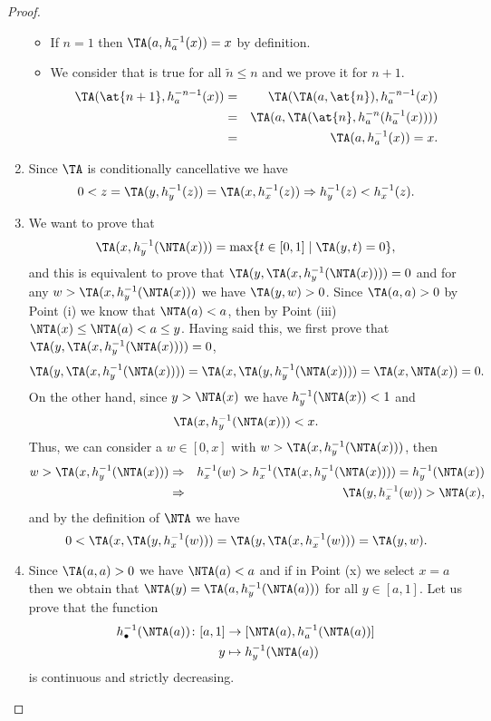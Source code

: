 \begin{proof}
\begin{enumerate}[label=(\roman*)]
\begin{itemize}
			\item If $n=1$ then $\TA(a,h_a^{-1}(x))=x$ by definition.
			\item We consider that is true for all $\tilde{n} \leq n$  and we prove it for $n+1$.
			\begin{eqnarray*}
				\TA(\at{n+1},h_a^{-n-1}(x)) &=& \TA(\TA(a,\at{n}),h_a^{-n-1}(x)) \\
				&=& \TA(a,\TA(\at{n},h_a^{-n}(h_a^{-1}(x)))) \\
				&=& \TA(a,h_a^{-1}(x))=x.
			\end{eqnarray*}
		\end{itemize}
		\item Since $\TA$ is conditionally cancellative we have
		$$0<z=\TA(y,h_y^{-1}(z))=\TA(x,h_x^{-1}(z)) \Rightarrow h_y^{-1}(z)<h_x^{-1}(z).$$
		\item We want to prove that
		$$\TA(x,h_{y}^{-1}(\NTA(x))) = \max \{ t \in [0,1] \mid \TA(y,t)=0\},$$
		and this is equivalent to prove that $\TA(y,\TA(x,h_{y}^{-1}(\NTA(x))))=0$ and for any $w>\TA(x,h_{y}^{-1}(\NTA(x)))$ we have $\TA(y,w)>0$. Since $\TA(a,a)>0$ by Point (i)  we know that $\NTA(a)<a$, then by Point (iii) $\NTA(x) \leq \NTA(a)<a \leq y$. Having said this, we first prove that $\TA(y,\TA(x,h_y^{-1}(\NTA(x))))=0$,
		$$\TA(y,\TA(x,h_y^{-1}(\NTA(x)))) = \TA(x,\TA(y,h_y^{-1}(\NTA(x)))) = \TA(x,\NTA(x))=0.$$
		On the other hand, since $ y > \NTA(x)$ we have $h_y^{-1}(\NTA(x))<1$ and 
		$$\TA(x,h_y^{-1}(\NTA(x)))<x.$$
		 Thus,  we can consider a $w \in [0,x]$ with $w > \TA(x,h_y^{-1}(\NTA(x)))$, then
		\begin{eqnarray*}
			w > \TA(x,h_y^{-1}(\NTA(x))) &\Rightarrow &h_x^{-1}(w) > h_x^{-1}(\TA(x,h_y^{-1}(\NTA(x))))=h_y^{-1}(\NTA(x))  \\
			&\Rightarrow& \TA(y,h_x^{-1}(w)) > \NTA(x),
		\end{eqnarray*}
		and by the definition of $\NTA$ we have
		$$0<\TA(x,\TA(y,h_x^{-1}(w)))=\TA(y,\TA(x,h_x^{-1}(w)))=\TA(y,w).$$
		\item Since $\TA(a,a)>0$ we have $\NTA(a)<a$ and if in Point (x) we select $x=a$ then we obtain that $\NTA(y)=\TA(a,h_y^{-1}(\NTA(a)))$ for all $y \in [a,1]$. Let us prove that the function
		\begin{align*}
			h_{\bullet}^{-1}(\NTA(a)) \colon [a,1] &\to [\NTA(a),h_a^{-1}(\NTA(a))]\\
			y &\mapsto h_y^{-1}(\NTA(a))
		\end{align*}
		is continuous and strictly decreasing.
		\begin{itemize}

\end{itemize}
\end{enumerate}
\end{proof}
